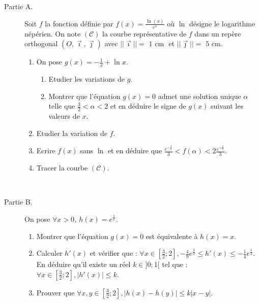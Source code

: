\begin{exo}
      \begin{description}
            \item[Partie A.]
                Soit $f$ la fonction d\'efinie par $f(x) = \frac{\ln(x)}{e^x}$ o\`u $\ln$ d\'esigne le logarithme n\'ep\'erien.
                On note $(\mathcal{C})$ la courbe repr\'esentative de $f$ dans un rep\`ere orthogonal 
                $(O,\vec{\imath},\vec{\jmath})$ avec $|| \vec{\imath} || = \text{ 1 cm }$ et $|| \vec{\jmath} || = \text{ 5 cm} $.
                \begin{enumerate}
                \item On pose $g(x) = - \frac{1}{x} + \ln x$.
                      \begin{enumerate}
                      \item Etudier les variations de $g$.
                      \item Montrer que l'\'equation $g(x) = 0$ admet une solution unique $\alpha$ telle que $\frac{3}{2} < \alpha < 2$ et en d\'eduire le signe de $g(x)$ suivant les valeurs de $x$.
                      \end{enumerate}
                \item Etudier la variation de $f$.
                \item Ecrire $f(x)$ sans $\ln$ et en d\'eduire que $\frac{e^{-\frac{3}{2}}}{3} < f(\alpha) < 2 \frac{e^{-\frac{3}{2}}}{3}$.
                \item Tracer la courbe $(\mathcal{C})$.
                \end{enumerate}
            ~\\[-2.5\baselineskip]
            \item[Partie B.]
                On pose $\forall x > 0,\ h(x) = e^{\frac{1}{x}}$.
                \begin{enumerate}
                \item Montrer que l'\'equation $g(x) = 0$ est \'equivalente \`a $h(x) = x$.
                \item Calculer $h'(x)$ et v\'erifier que : $\forall x \in \left[ \frac{3}{2} ; 2 \right] , - \frac{4}{9} e^{\frac{2}{3}} \leq h'(x) \leq - \frac{1}{4} e^{\frac{1}{2}}$. \\
                En d\'eduire qu'il existe un r\'eel $k \in ]0;1[$ tel que : $\forall x \in \left[ \frac{3}{2} ; 2 \right] , \left| h'(x) \right| \leq k$.
                \item Prouver que $\forall x, y \in \left[ \frac{3}{2} ; 2 \right] , \left| h(x) - h(y) \right| \leq k |x - y|$.

\end{enumerate}
\end{description}
\end{exo}
